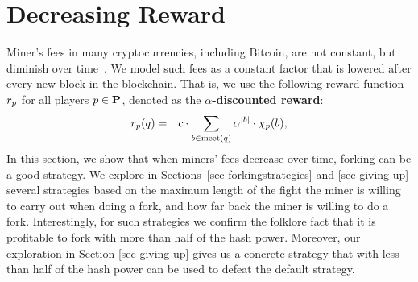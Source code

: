 
\section{Decreasing Reward}
\label{sec-dec}


Miner's fees in many cryptocurrencies, including Bitcoin, are not constant, but diminish over time~\cite{Bitcoin,Monero,Litecoin,Bcash}. We model such 
fees as a constant factor that is lowered after every new block in the blockchain. That is, 
we use the following reward function $r_p$ for all players $p \in \mathbf{P}$, denoted as the \textbf{$\alpha$-discounted reward}: 
\begin{eqnarray*}
r_p(q) & = & 
c \cdot \sum_{b \in \text{\rm meet}(q)} \alpha^{|b|} \cdot \chi_p(b),
\end{eqnarray*}
In this section, we show that when miners' fees decrease over time, forking can be a good strategy. We explore in Sections~\ref{sec-forkingstrategies} and \ref{sec-giving-up} several strategies based on the maximum length of the fight the miner is willing to carry out when doing a fork, and how far back the miner is willing to do a fork. Interestingly, for such strategies we confirm the folklore fact that it is profitable to fork with more than half of the hash power. Moreover, our exploration in Section \ref{sec-giving-up} gives us a concrete strategy that with less than half of the hash power 
can be used to defeat the default strategy. %

